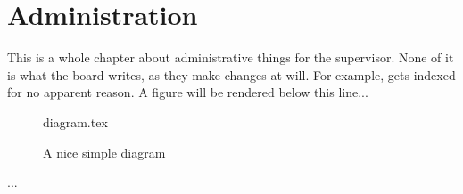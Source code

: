 \documentclass[float=false, crop=false]{standalone}
\begin{document}
\chapter{Administration}
This is a whole chapter about administrative things for the supervisor. None of it is what the board writes, as they make changes at will. For example, 
 gets indexed for no apparent reason.
A 
 figure will be rendered below this line...
 
\begin{figure}[ht]
 
{diagram.tex}
 
\label{fig:tikzexample}
\caption{A nice simple diagram}
\end{figure}
 
...
\end{document}
